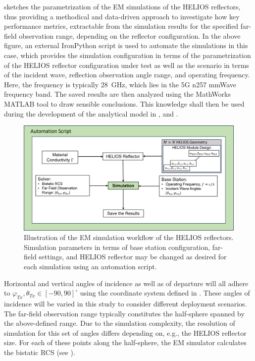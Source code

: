  sketches the parametrization of the EM simulations of the HELIOS reflectors, thus providing a methodical and data-driven approach to investigate how key performance metrics, extractable from the simulation results for the specified far-field observation range, depending on the reflector configuration. In the above figure, an external IronPython script is used to automate the simulations in this case, which provides the simulation configuration in terms of the parametrization of the HELIOS reflector configuration under test as well as the scenario in terms of the incident wave, reflection observation angle range, and operating frequency. Here, the frequency is typically \SI{28}{\giga\hertz}, which lies in the 5G n\num{257} mmWave frequency band. The saved results are then analyzed using the MathWorks MATLAB tool to draw sensible conclusions. This knowledge shall then be used during the development of the analytical model in , and .

\begin{figure}[tb]
	\centering
	\includegraphics[width=1.0\linewidth]{images/Section 3 Images/Ansys_workflow}
	\caption{Illustration of the EM simulation workflow of the HELIOS reflectors. Simulation parameters in terms of base station configuration, far-field settings, and HELIOS reflector may be changed as desired for each simulation using an automation script.}
	\label{fig:SimulationFlow}
\end{figure}
Horizontal and vertical angles of incidence as well as of departure will all adhere to $\varphi_{Tx}, \theta_{Tx} \in [-90, 90]^\circ$ using the coordinate system defined in . These angles of incidence will be varied in this study to consider different deployment scenarios. The far-field observation range typically constitutes the half-sphere spanned by the above-defined range. Due to the simulation complexity, the resolution of simulation for this set of angles differs depending on, e.g., the HELIOS reflector size. For each of these points along the half-sphere, the EM simulator calculates the bistatic RCS (see ).


